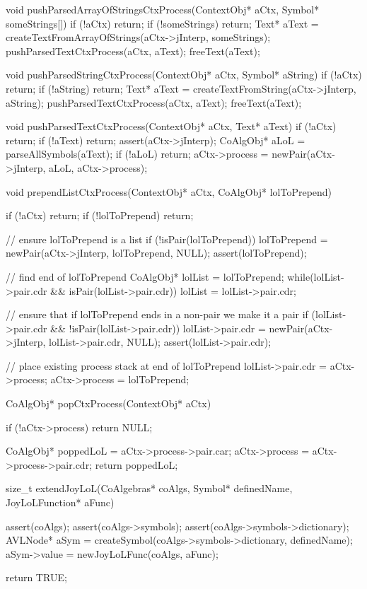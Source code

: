 void pushParsedArrayOfStringsCtxProcess(ContextObj* aCtx, Symbol* someStrings[]) {
  if (!aCtx) return;
  if (!someStrings) return;
  Text* aText = createTextFromArrayOfStrings(aCtx->jInterp, someStrings);
  pushParsedTextCtxProcess(aCtx, aText);
  freeText(aText);
}

void pushParsedStringCtxProcess(ContextObj* aCtx, Symbol* aString) {
  if (!aCtx) return;
  if (!aString) return;
  Text* aText = createTextFromString(aCtx->jInterp, aString);
  pushParsedTextCtxProcess(aCtx, aText);
  freeText(aText);
}

void pushParsedTextCtxProcess(ContextObj* aCtx, Text* aText) {
  if (!aCtx) return;
  if (!aText) return;
  assert(aCtx->jInterp);
  CoAlgObj* aLoL = parseAllSymbols(aText);
  if (!aLoL) return;
  aCtx->process = newPair(aCtx->jInterp, aLoL, aCtx->process);
}

void prependListCtxProcess(ContextObj* aCtx, CoAlgObj* lolToPrepend) {
  if (!aCtx) return;
  if (!lolToPrepend) return;

  // ensure lolToPrepend is a list
  if (!isPair(lolToPrepend)) {
    lolToPrepend = newPair(aCtx->jInterp, lolToPrepend, NULL);
    assert(lolToPrepend);
  }

  // find end of lolToPrepend
  CoAlgObj* lolList = lolToPrepend;
  while(lolList->pair.cdr && isPair(lolList->pair.cdr)) {
    lolList = lolList->pair.cdr;
  }

  // ensure that if lolToPrepend ends in a non-pair we make it a pair
  if (lolList->pair.cdr && !isPair(lolList->pair.cdr)) {
    lolList->pair.cdr = newPair(aCtx->jInterp, lolList->pair.cdr, NULL);
    assert(lolList->pair.cdr);
  }

  // place existing process stack at end of lolToPrepend
  lolList->pair.cdr  = aCtx->process;
  aCtx->process = lolToPrepend;
}

CoAlgObj* popCtxProcess(ContextObj* aCtx) {
  if (!aCtx->process) return NULL;

  CoAlgObj* poppedLoL = aCtx->process->pair.car;
  aCtx->process       = aCtx->process->pair.cdr;
  return poppedLoL;
}

size_t extendJoyLoL(CoAlgebras* coAlgs,
                    Symbol* definedName,
                    JoyLoLFunction* aFunc) {
  assert(coAlgs);
  assert(coAlgs->symbols);
  assert(coAlgs->symbols->dictionary);
  AVLNode* aSym =
    createSymbol(coAlgs->symbols->dictionary, definedName);
  aSym->value = newJoyLoLFunc(coAlgs, aFunc);

  return TRUE;
}

